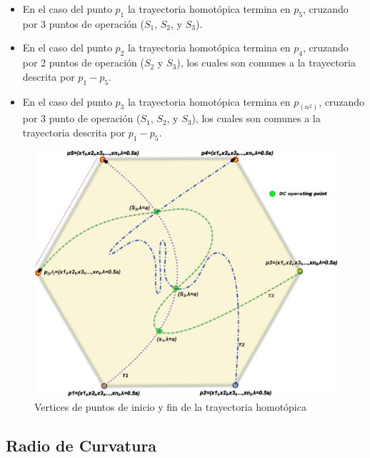 \documentclass[conference,letterpaper,onecolumn]{IEEEtran}
\begin{document}
{\begin{itemize} 
\item En el caso del punto $p_1$ la trayectoria homot\'opica termina en $p_5$, cruzando por 3 puntos de operaci\'on ($S_1$, $S_2$, y $S_3$).
\item En el caso del punto $p_2$ la trayectoria homot\'opica termina en $p_4$, cruzando por 2 puntos de operaci\'on ($S_2$ y $S_3$), los cuales 
son comunes a la trayectoria descrita por $p_1-p_5$.
\item En el caso del punto $p_3$ la trayectoria homot\'opica termina en $p_{(n^2)}$, cruzando por 3 punto de operaci\'on ($S_1$, $S_2$, y $S_3$), los cuales 
son comunes a la trayectoria descrita por $p_1-p_5$.
\end{itemize}

\begin{figure}[tbp]
\centering
\includegraphics[width=12cm]{figs/poligono.eps}
\caption{Vertices de puntos de inicio y fin de la trayectoria homot\'opica}
\label{poligono}
\end{figure}

\subsection{Radio de Curvatura}

}
\end{document}

